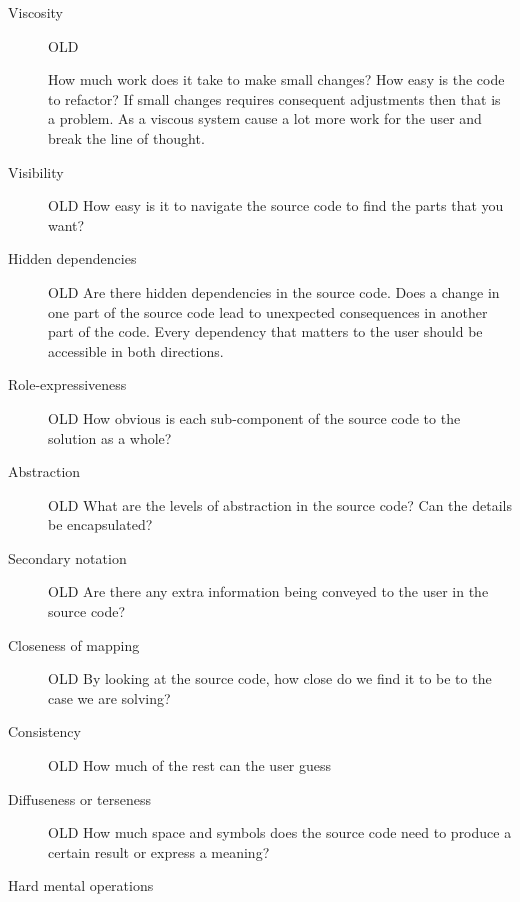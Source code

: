\begin{description}

\item[ Viscosity ]
    OLD

How much work does it take to make small changes? How easy is the code to
refactor? If small changes requires consequent adjustments then that is a
problem. As a viscous system cause a lot more work for the user and break the
line of thought.

\item[ Visibility ]

    OLD
How easy is it to navigate the source code to find the parts that you want?

\item[ Hidden dependencies ]

    OLD
Are there hidden dependencies in the source code. Does a change in one part of
the source code lead to unexpected consequences in another part of the code.
Every dependency that matters to the user should be accessible in both
directions. 

\item[ Role-expressiveness ]

    OLD
How obvious is each sub-component of the source code to the solution as a whole?

\item[ Abstraction ]

    OLD
What are the levels of abstraction in the source code? Can the details be
encapsulated?

\item[ Secondary notation ]

    OLD
Are there any extra information being conveyed to the user in the source code?

\item[ Closeness of mapping ]

    OLD
By looking at the source code, how close do we find it to be to the case
we are solving?

\item[ Consistency ]

    OLD
How much of the rest can the user guess 


\item[ Diffuseness or terseness ]

    OLD
How much space and symbols does the source code need to produce a certain result
or express a meaning?

\item[ Hard mental operations ]


\end{description}
